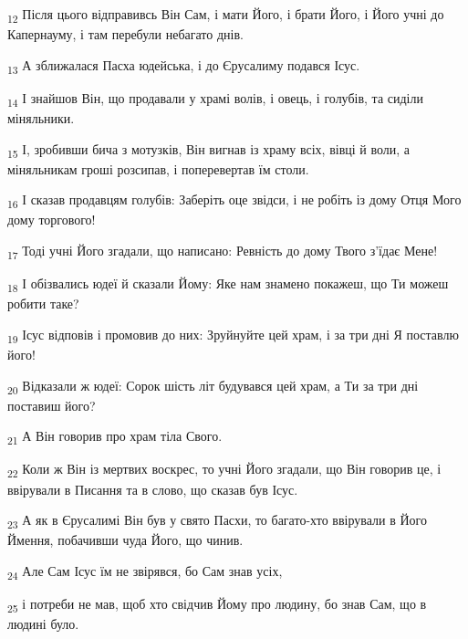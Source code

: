\begin{tcolorbox}
\textsubscript{12} Після цього відправивсь Він Сам, і мати Його, і брати Його, і Його учні до Капернауму, і там перебули небагато днів.
\end{tcolorbox}
\begin{tcolorbox}
\textsubscript{13} А зближалася Пасха юдейська, і до Єрусалиму подався Ісус.
\end{tcolorbox}
\begin{tcolorbox}
\textsubscript{14} І знайшов Він, що продавали у храмі волів, і овець, і голубів, та сиділи міняльники.
\end{tcolorbox}
\begin{tcolorbox}
\textsubscript{15} І, зробивши бича з мотузків, Він вигнав із храму всіх, вівці й воли, а міняльникам гроші розсипав, і поперевертав їм столи.
\end{tcolorbox}
\begin{tcolorbox}
\textsubscript{16} І сказав продавцям голубів: Заберіть оце звідси, і не робіть із дому Отця Мого дому торгового!
\end{tcolorbox}
\begin{tcolorbox}
\textsubscript{17} Тоді учні Його згадали, що написано: Ревність до дому Твого з'їдає Мене!
\end{tcolorbox}
\begin{tcolorbox}
\textsubscript{18} І обізвались юдеї й сказали Йому: Яке нам знамено покажеш, що Ти можеш робити таке?
\end{tcolorbox}
\begin{tcolorbox}
\textsubscript{19} Ісус відповів і промовив до них: Зруйнуйте цей храм, і за три дні Я поставлю його!
\end{tcolorbox}
\begin{tcolorbox}
\textsubscript{20} Відказали ж юдеї: Сорок шість літ будувався цей храм, а Ти за три дні поставиш його?
\end{tcolorbox}
\begin{tcolorbox}
\textsubscript{21} А Він говорив про храм тіла Свого.
\end{tcolorbox}
\begin{tcolorbox}
\textsubscript{22} Коли ж Він із мертвих воскрес, то учні Його згадали, що Він говорив це, і ввірували в Писання та в слово, що сказав був Ісус.
\end{tcolorbox}
\begin{tcolorbox}
\textsubscript{23} А як в Єрусалимі Він був у свято Пасхи, то багато-хто ввірували в Його Ймення, побачивши чуда Його, що чинив.
\end{tcolorbox}
\begin{tcolorbox}
\textsubscript{24} Але Сам Ісус їм не звірявся, бо Сам знав усіх,
\end{tcolorbox}
\begin{tcolorbox}
\textsubscript{25} і потреби не мав, щоб хто свідчив Йому про людину, бо знав Сам, що в людині було.
\end{tcolorbox}
